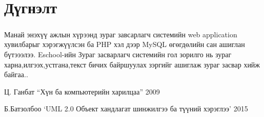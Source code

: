 \chapter{Дүгнэлт}
\label{chap:intro}
\paragraph{}
Манай энэхүү ажлын хүрээнд зураг завсарлагч системийн web application хувилбарыг хэрэгжүүлсэн ба PHP хэл дээр MySQL өгөгдөлийн сан ашиглан бүтэээлээ. Eschool-ийн Зураг засварлагч системийн гол зорилго нь зураг харна,илгээх,устгана,текст бичих байршуулах зэргийг ашиглаж зураг засвар хийж байгаа..

\begin{thebibliography}{9}

 Ц. Ганбат “Хүн ба компьютерийн харилцаа” 2009	
 
 Б.Батзолбоо ‘UML 2.0 Объект хандлагат шинжилгээ ба түүний хэрэглээ’ 2015

\end{thebibliography}



